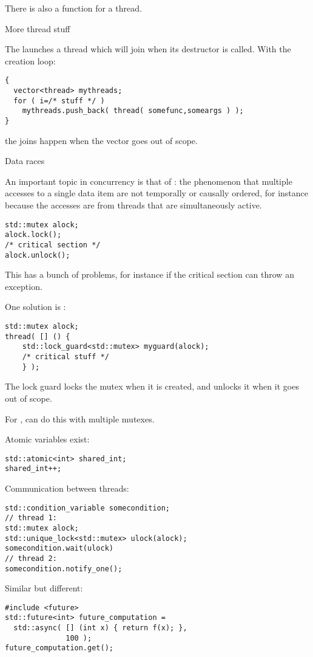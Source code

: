 There is also a  function for a thread.

 {More thread stuff}

The   launches a thread
which will join when its destructor is called.
With the creation loop:
\begin{lstlisting}
{
  vector<thread> mythreads;
  for ( i=/* stuff */ )
    mythreads.push_back( thread( somefunc,someargs ) );
}
\end{lstlisting}
the joins happen when the vector goes out of scope.

 {Data races}

An important topic in concurrency is that of
:
the phenomenon that multiple accesses to a single data item
are not temporally or causally ordered,
for instance because the accesses are from threads
that are simultaneously active.

\begin{lstlisting}
std::mutex alock;
alock.lock();
/* critical section */
alock.unlock();
\end{lstlisting}
This has a bunch of problems, for instance if the critical section can throw
an exception.

One solution is :
\begin{lstlisting}
std::mutex alock;
thread( [] () {
    std::lock_guard<std::mutex> myguard(alock);
    /* critical stuff */
    } );
\end{lstlisting}
The lock guard locks the mutex when it is created,
and unlocks it when it goes out of scope.

For , 
can do this with multiple mutexes.

Atomic variables exist:
\begin{lstlisting}
std::atomic<int> shared_int;
shared_int++;
\end{lstlisting}

Communication between threads:
\begin{lstlisting}
std::condition_variable somecondition;
// thread 1:
std::mutex alock;
std::unique_lock<std::mutex> ulock(alock);
somecondition.wait(ulock)
// thread 2:
somecondition.notify_one();
\end{lstlisting}

Similar but different:
\begin{lstlisting}
#include <future>
std::future<int> future_computation =
  std::async( [] (int x) { return f(x); },
              100 );
future_computation.get();
\end{lstlisting}

